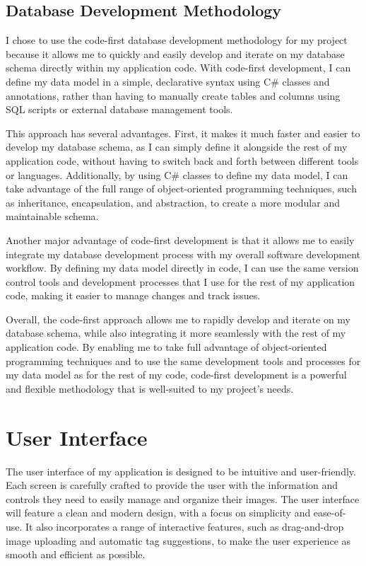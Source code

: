 \documentclass[a4paper,12pt]{article}
\begin{document}
\newpage
\subsection{Database Development Methodology}
I chose to use the code-first database development methodology for my project because it allows me to quickly and easily develop and iterate on my database schema directly within my application code. With code-first development, I can define my data model in a simple, declarative syntax using C\# classes and annotations, rather than having to manually create tables and columns using SQL scripts or external database management tools.

This approach has several advantages. First, it makes it much faster and easier to develop my database schema, as I can simply define it alongside the rest of my application code, without having to switch back and forth between different tools or languages. Additionally, by using C\# classes to define my data model, I can take advantage of the full range of object-oriented programming techniques, such as inheritance, encapsulation, and abstraction, to create a more modular and maintainable schema.

Another major advantage of code-first development is that it allows me to easily integrate my database development process with my overall software development workflow. By defining my data model directly in code, I can use the same version control tools and development processes that I use for the rest of my application code, making it easier to manage changes and track issues.

Overall, the code-first approach allows me to rapidly develop and iterate on my database schema, while also integrating it more seamlessly with the rest of my application code. By enabling me to take full advantage of object-oriented programming techniques and to use the same development tools and processes for my data model as for the rest of my code, code-first development is a powerful and flexible methodology that is well-suited to my project's needs.

\newpage
\section{User Interface}
The user interface of my application is designed to be intuitive and user-friendly. Each screen is carefully crafted to provide the user with the information and controls they need to easily manage and organize their images. The user interface will feature a clean and modern design, with a focus on simplicity and ease-of-use. It also incorporates a range of interactive features, such as drag-and-drop image uploading and automatic tag suggestions, to make the user experience as smooth and efficient as possible.
\end{document}
